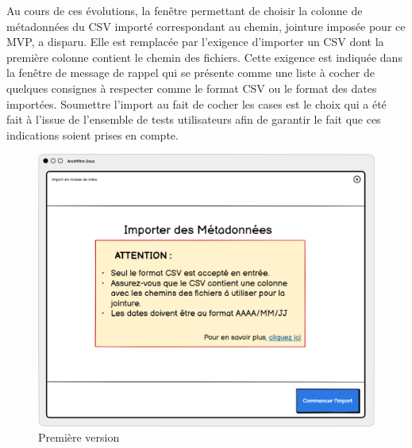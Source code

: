 Au cours de ces évolutions, la fenêtre permettant de choisir la colonne de métadonnées du CSV importé correspondant au chemin, jointure imposée pour ce \gls{MVP}, a disparu. Elle est remplacée par l’exigence d’importer un CSV dont la première colonne contient le chemin des fichiers. Cette exigence est indiquée dans la fenêtre de message de rappel qui se présente comme une liste à cocher de quelques consignes à respecter comme le format CSV ou le format des dates importées. Soumettre l’import au fait de cocher les cases est le choix qui a été fait à l’issue de l’ensemble de tests utilisateurs afin de garantir le fait que ces indications soient prises en compte. 

\clearpage

\begin{figure}[h]
	\centering
	\begin{minipage}[b]{0.45\textwidth} %
		\centering
		\includegraphics[width=\textwidth]{illustrations/figure21.png}
		\caption{Première version}
		\label{figure21}
	\end{minipage}
	\hfill %
	\begin{minipage}[b]{0.45\textwidth}
		\centering

\end{minipage}
\end{figure}
